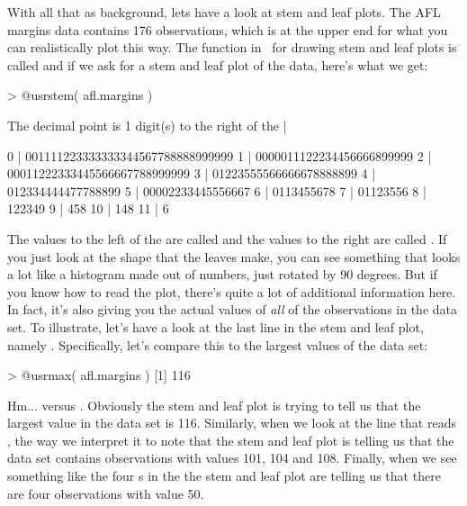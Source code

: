 With all that as background, lets have a look at stem and leaf plots. The AFL margins data contains 176 observations, which is at the upper end for what you can realistically plot this way. The function in \R\ for drawing stem and leaf plots is called  and if we ask for a stem and leaf plot of the  data, here's what we get:
\begin{rblock1}
> @usr{stem( afl.margins )}

  The decimal point is 1 digit(s) to the right of the |

   0 | 001111223333333344567788888999999
   1 | 0000011122234456666899999
   2 | 00011222333445566667788999999
   3 | 01223555566666678888899
   4 | 012334444477788899
   5 | 00002233445556667
   6 | 0113455678
   7 | 01123556
   8 | 122349
   9 | 458
  10 | 148
  11 | 6
\end{rblock1}
The values to the left of the \rtext{|} are called  and the values to the right are called . If you just look at the shape that the leaves make, you can see something that looks a lot like a histogram made out of numbers, just rotated by 90 degrees. But if you know how to read the plot, there's  quite a lot of additional information here. In fact, it's also giving you the actual values of {\it all} of the observations in the data set. To illustrate, let's have a look at the last line in the stem and leaf plot, namely . Specifically, let's compare this to the largest values of the  data set:
\begin{rblock1}
> @usr{max( afl.margins )}
[1] 116
\end{rblock1}
Hm...  versus . Obviously the stem and leaf plot is trying to tell us that the largest value in the data set is 116. Similarly, when we look at the line that reads , the way we interpret it to note that the stem and leaf plot is telling us that the data set contains observations with values 101, 104 and 108. Finally, when we see something like 
the four s in the the stem and leaf plot are telling us that there are four observations with value 50. 


